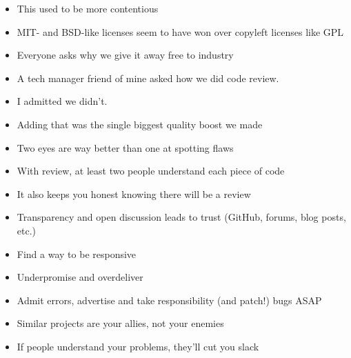 \documentclass[9pt]{report}
\begin{document}
\begin{itemize}
\item This used to be more contentious
\item MIT- and BSD-like licenses seem to have won over copyleft
  licenses like GPL
\item Everyone asks why we give it away free to industry
\end{itemize}

\begin{itemize}
\item A tech manager friend of mine asked how we did code review.
\item I admitted we didn't.
\item Adding that was the single biggest quality boost we made
\item Two eyes are way better than one at spotting flaws
\item With review, at least two people understand each piece of code
\item It also keeps you honest knowing there will be a review
\end{itemize}



\begin{itemize}
\item Transparency and open discussion leads to trust (GitHub, forums,
  blog posts, etc.)
\item Find a way to be responsive
\item Underpromise and overdeliver
\item Admit errors, advertise and take responsibility (and patch!)
  bugs ASAP
\item Similar projects are your allies, not your enemies
\item If people understand your problems, they'll cut you slack
\end{itemize}
\end{document}
